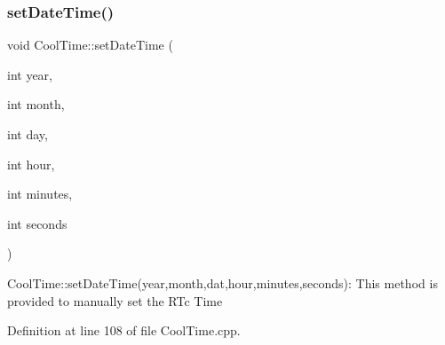 \subsubsection{\texorpdfstring{set\+Date\+Time()}{setDateTime()}}
{\footnotesize\ttfamily void Cool\+Time\+::set\+Date\+Time (\begin{DoxyParamCaption}\item[{int}]{year,  }\item[{int}]{month,  }\item[{int}]{day,  }\item[{int}]{hour,  }\item[{int}]{minutes,  }\item[{int}]{seconds }\end{DoxyParamCaption})}

Cool\+Time\+::set\+Date\+Time(year,month,dat,hour,minutes,seconds)\+: This method is provided to manually set the R\+Tc Time 

Definition at line 108 of file Cool\+Time.\+cpp.


